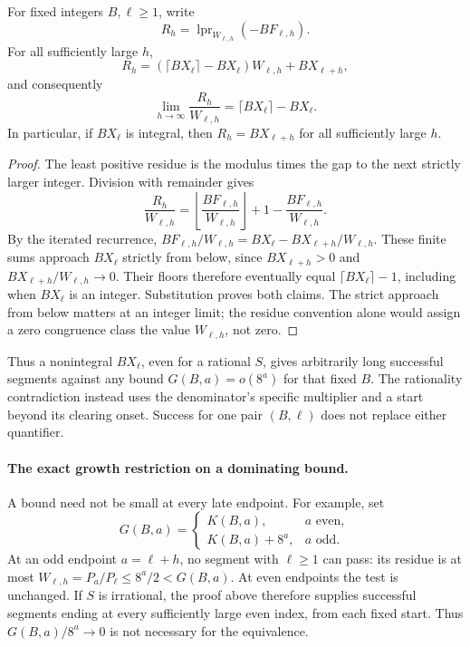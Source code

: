 \documentclass[11pt]{article}
\theoremstyle{remark}
\theoremstyle{plain}
\newcommand{\lpr}{\operatorname{lpr}}
\begin{document}
\begin{proposition}
\label{long269:res:residue-limit}
For fixed integers $B,\ell\ge1$, write
\[
 R_h=\lpr_{W_{\ell,h}}(-BF_{\ell,h}).
\]
For all sufficiently large $h$,
\[
 R_h=(\lceil BX_\ell\rceil-BX_\ell)W_{\ell,h}+BX_{\ell+h},
\]
and consequently
\[
 \lim_{h\to\infty}\frac{R_h}{W_{\ell,h}}
 =\lceil BX_\ell\rceil-BX_\ell.
\]
In particular, if $BX_\ell$ is integral, then $R_h=BX_{\ell+h}$
for all sufficiently large $h$.
\end{proposition}
\begin{proof}
The least positive residue is the modulus times the gap to the next
strictly larger integer.  Division with remainder gives
\[
 \frac{R_h}{W_{\ell,h}}
 =\left\lfloor\frac{BF_{\ell,h}}{W_{\ell,h}}\right\rfloor+1
       -\frac{BF_{\ell,h}}{W_{\ell,h}}.
\]
By the iterated recurrence,
$BF_{\ell,h}/W_{\ell,h}=BX_\ell-BX_{\ell+h}/W_{\ell,h}$.
These finite sums approach $BX_\ell$ strictly from below, since
$BX_{\ell+h}>0$ and $BX_{\ell+h}/W_{\ell,h}\to0$.
Their floors therefore eventually equal $\lceil BX_\ell\rceil-1$,
including when $BX_\ell$ is an integer.  Substitution proves both claims.
The strict approach from below matters at an integer limit; the residue
convention alone would assign a zero congruence class the value
$W_{\ell,h}$, not zero.
\end{proof}
Thus a nonintegral $BX_\ell$, even for a rational $S$, gives arbitrarily
long successful segments against any bound $G(B,a)=o(8^a)$ for that fixed
$B$.  The rationality contradiction instead uses the denominator's
specific multiplier and a start beyond its clearing onset.  Success for
one pair $(B,\ell)$ does not replace either quantifier.

\paragraph{The exact growth restriction on a dominating bound.}
A bound need not be small at every late endpoint.  For example, set
\[
 G(B,a)=
 \begin{cases}
 K(B,a),&a\text{ even},\\
 K(B,a)+8^a,&a\text{ odd}.
 \end{cases}
\]
At an odd endpoint $a=\ell+h$, no segment with $\ell\ge1$ can pass:
its residue is at most $W_{\ell,h}=P_a/P_\ell\le8^a/2<G(B,a)$.
At even endpoints the test is unchanged.  If $S$ is irrational, the
proof above therefore supplies successful segments ending at every
sufficiently large even index, from each fixed start.  Thus
$G(B,a)/8^a\to0$ is not necessary for the equivalence.
\end{document}
